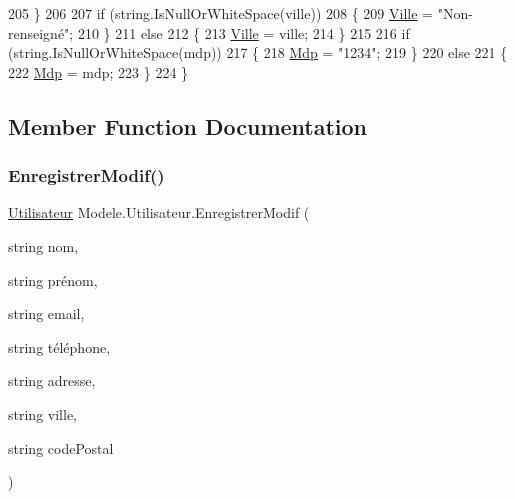 \begin{DoxyCode}
205             \}
206 
207             \textcolor{keywordflow}{if} (\textcolor{keywordtype}{string}.IsNullOrWhiteSpace(ville))
208             \{
209                 \hyperlink{classModele_1_1Utilisateur_add873e1f9c9c49bc1ab75d4850a41aa8}{Ville} = \textcolor{stringliteral}{"Non-renseigné"};
210             \}
211             \textcolor{keywordflow}{else}
212             \{
213                 \hyperlink{classModele_1_1Utilisateur_add873e1f9c9c49bc1ab75d4850a41aa8}{Ville} = ville;
214             \}
215 
216             \textcolor{keywordflow}{if} (\textcolor{keywordtype}{string}.IsNullOrWhiteSpace(mdp))
217             \{
218                 \hyperlink{classModele_1_1Utilisateur_a6da26e59e09412a036824cf27dac6976}{Mdp} = \textcolor{stringliteral}{"1234"};
219             \}
220             \textcolor{keywordflow}{else}
221             \{
222                 \hyperlink{classModele_1_1Utilisateur_a6da26e59e09412a036824cf27dac6976}{Mdp} = mdp;
223             \}
224         \}
\end{DoxyCode}


\subsection{Member Function Documentation}
\mbox{\label{classModele_1_1Utilisateur_a519e48833feeb7dd4b7dace0a32dab30}} 
\subsubsection{\texorpdfstring{Enregistrer\+Modif()}{EnregistrerModif()}}
{\footnotesize\ttfamily \hyperlink{classModele_1_1Utilisateur}{Utilisateur} Modele.\+Utilisateur.\+Enregistrer\+Modif (\begin{DoxyParamCaption}\item[{string}]{nom,  }\item[{string}]{prénom,  }\item[{string}]{email,  }\item[{string}]{téléphone,  }\item[{string}]{adresse,  }\item[{string}]{ville,  }\item[{string}]{code\+Postal }\end{DoxyParamCaption})\hspace{0.3cm}{\ttfamily [inline]}}



